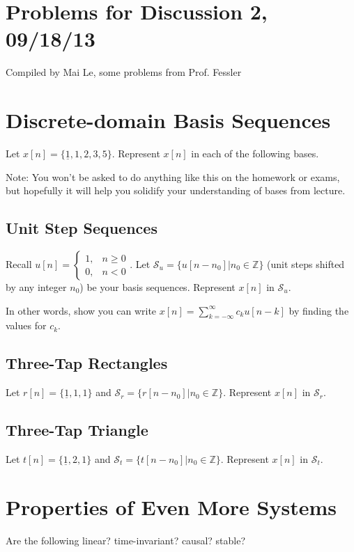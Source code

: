 \documentclass[11pt]{article}
\begin{document}
\section*{Problems for Discussion 2, 09/18/13}
Compiled by Mai Le, some problems from Prof. Fessler

\section{Discrete-domain Basis Sequences}
Let $x[n] = \{\underline{1},1,2,3,5\}$. Represent $x[n]$ in each of the following bases. 

Note: You won't be asked to do anything like this on the homework or exams, but hopefully it will help you solidify your understanding of bases from lecture.

\subsection*{Unit Step Sequences}
Recall $u[n] = \begin{cases}1, & n \geq 0\\ 0, & n < 0 \end{cases}$. Let $\mathcal{S}_u = \{u[n-n_0]|n_0 \in \mathbb{Z}\}$ (unit steps shifted by any integer $n_0$) be your basis sequences. Represent $x[n]$ in $\mathcal{S}_u$.

In other words, show you can write $x[n]=\sum\limits_{k=-\infty}^\infty c_k u[n-k]$ by finding the values for $c_k$.

\subsection*{Three-Tap Rectangles}
Let $r[n] = \{\underline{1},1,1\}$ and $\mathcal{S}_r = \{r[n-n_0]|n_0 \in \mathbb{Z}\}$. Represent $x[n]$ in $\mathcal{S}_r$.

\subsection*{Three-Tap Triangle}
Let $t[n] = \{\underline{1},2,1\}$ and $\mathcal{S}_t = \{t[n-n_0]|n_0 \in \mathbb{Z}\}$. Represent $x[n]$ in $\mathcal{S}_t$.

\section{Properties of Even More Systems}
Are the following linear? time-invariant? causal? stable?
\end{document}
